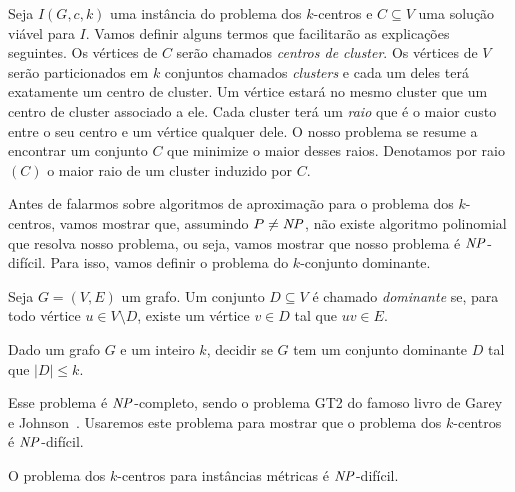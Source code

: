 Seja $I(G,c,k)$ uma instância do problema dos $k$-centros e $C \subseteq V$ uma solução viável para $I$. Vamos definir alguns termos que facilitarão as explicações seguintes. Os vértices de $C$ serão chamados \emph{centros de cluster}. Os vértices de $V$ serão particionados em $k$ conjuntos chamados \emph{clusters} e cada um deles terá exatamente um centro de cluster. Um vértice estará no mesmo cluster que um centro de cluster associado a ele. Cada cluster terá um \emph{raio} que é o maior custo entre o seu centro e um vértice qualquer dele. O nosso problema se resume a encontrar um conjunto $C$ que minimize o maior desses raios. Denotamos por raio$(C)$ o maior raio de um cluster induzido por $C$.

Antes de falarmos sobre algoritmos de aproximação para o problema dos $k$-centros, vamos mostrar que, assumindo $P\neq\mathit{NP}$, não existe algoritmo polinomial que resolva nosso problema, ou seja, vamos mostrar que nosso problema é $\mathit{NP}$-difícil. Para isso, vamos definir o problema do $k$-conjunto dominante.

\begin{definition}
    Seja $G = (V,E)$ um grafo. Um conjunto $D \subseteq V$ é chamado \emph{dominante} se, para todo vértice $u \in V \setminus D$, existe um vértice $v \in D$ tal que $uv \in E$.
\end{definition}

\begin{problem}
    Dado um grafo $G$ e um inteiro $k$, decidir se $G$ tem um conjunto dominante $D$ tal que $|D| \leq k$.      
\end{problem}
Esse problema é $\mathit{NP}$-completo, sendo o problema GT2 do famoso livro de Garey e Johnson~\cite{garey1979computers}. Usaremos este problema para mostrar que o problema dos $k$-centros é $\mathit{NP}$-difícil.

\begin{theorem}\label{theorem:2.3}
    O problema dos $k$-centros para instâncias métricas é $\mathit{NP}$-difícil.
\end{theorem}

